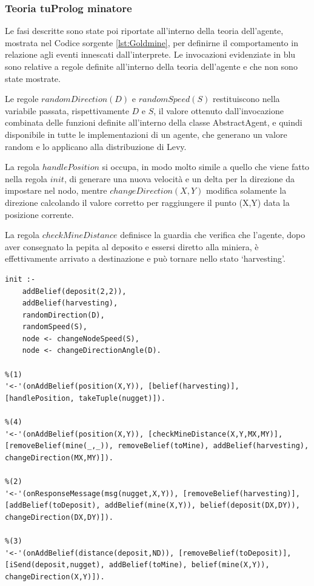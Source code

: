 \subsubsection{Teoria tuProlog minatore}
Le fasi descritte sono state poi riportate all'interno della teoria dell'agente, mostrata nel Codice sorgente \ref{lst:Goldmine}, per definirne il comportamento in relazione agli eventi innescati dall'interprete. Le invocazioni evidenziate in blu sono relative a regole definite all'interno della teoria dell'agente e che non sono state mostrate.

Le regole $ randomDirection(D)$ e $randomSpeed(S)$ restituiscono nella variabile passata, rispettivamente $D$ e $S$, il valore ottenuto dall'invocazione combinata delle funzioni definite all'interno della classe AbstractAgent, e quindi disponibile in tutte le implementazioni di un agente, che generano un valore random e lo applicano alla distribuzione di Levy.

La regola $handlePosition$ si occupa, in modo molto simile a quello che viene fatto nella regola $init$, di generare una nuova velocità e un delta per la direzione da impostare nel nodo, mentre $changeDirection(X,Y)$ modifica solamente la direzione calcolando il valore corretto per raggiungere il punto (X,Y) data la posizione corrente.

La regola $checkMineDistance$ definisce la guardia che verifica che l'agente, dopo aver consegnato la pepita al deposito e essersi diretto alla miniera, è effettivamente arrivato a destinazione e può tornare nello stato `harvesting'.

\switchToProlog{}
\medskip
\begin{lstlisting}[float,firstnumber=1,label={lst:Miner},caption={Teoria minatore}]
init :-
    addBelief(deposit(2,2)),
    addBelief(harvesting),
    randomDirection(D),
    randomSpeed(S),
    node <- changeNodeSpeed(S),
    node <- changeDirectionAngle(D).

%(1)
'<-'(onAddBelief(position(X,Y)), [belief(harvesting)], [handlePosition, takeTuple(nugget)]).

%(4)
'<-'(onAddBelief(position(X,Y)), [checkMineDistance(X,Y,MX,MY)], [removeBelief(mine(_,_)), removeBelief(toMine), addBelief(harvesting), changeDirection(MX,MY)]).

%(2)
'<-'(onResponseMessage(msg(nugget,X,Y)), [removeBelief(harvesting)], [addBelief(toDeposit), addBelief(mine(X,Y)), belief(deposit(DX,DY)), changeDirection(DX,DY)]).

%(3)
'<-'(onAddBelief(distance(deposit,ND)), [removeBelief(toDeposit)], [iSend(deposit,nugget), addBelief(toMine), belief(mine(X,Y)), changeDirection(X,Y)]).
\end{lstlisting}

